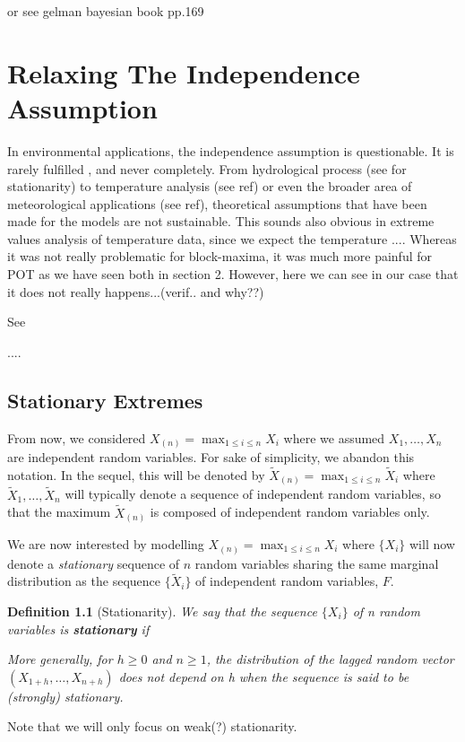 \documentclass[11pt,a4paper,openany ]{book}
\newtheorem{definition}{Definition}[chapter]
\begin{document}
or see gelman bayesian book pp.169





\chapter{Relaxing The Independence Assumption}\label{sec::3}
\vspace{-1cm}
\minitoc\thispagestyle{empty}

In environmental applications, the independence assumption is questionable. It is rarely fulfilled \cite{}, and never completely. From hydrological process (see \citet{milly_stationarity_2008} for stationarity) to temperature analysis (see ref) or even the broader area of meteorological applications (see ref), theoretical assumptions that have been made for the models are not sustainable. This sounds also obvious in extreme values analysis of temperature data, since we expect the temperature .... Whereas it was not really problematic for block-maxima, it was much more painful for POT as we have seen  both in section 2. 
However, here we can see in our case that it does not really happens...(verif.. and why??)

See \cite[pp.375]{beirlant_statistics_2006}

....

\section{Stationary Extremes}\label{sec:statio}

From now, we considered $X_{(n)}=\max_{1\leq i\leq n}X_i$  where we assumed 
$X_1,\dots,X_n$  are independent random variables. For sake of simplicity, we abandon this 
notation. In the sequel, this will be denoted by $\tilde{X}_{(n)}=\max_{1\leq i\leq 
n}\tilde{X}_i$ where $\tilde{X}_1,\dots,\tilde{X}_n$ will typically denote a sequence of 
independent random variables, so that the maximum $\tilde{X}_{(n)}$ is composed of independent random variables only.

 We are now interested by modelling 
$X_{(n)}=\max_{1\leq i\leq n}X_i$ where $\{X_i\}$ will now denote a \emph{stationary} 
sequence of $n$ random variables sharing the same marginal distribution as the sequence $\{\tilde{X}_i\}$ of independent random variables, 
$F$.

\begin{definition}[Stationarity] We say that the sequence $\{X_i\}$ of n random variables is \emph{\textbf{stationary}} if 
	
	More generally, for $h\geq 0$ and $n\geq 1$, the distribution of the lagged random vector $(X_{1+h},\dots,X_{n+h})$ does not depend on h when the sequence is said to be (strongly) stationary.
\end{definition}
Note that we will only focus on weak(?) stationarity. \\
\end{document}

